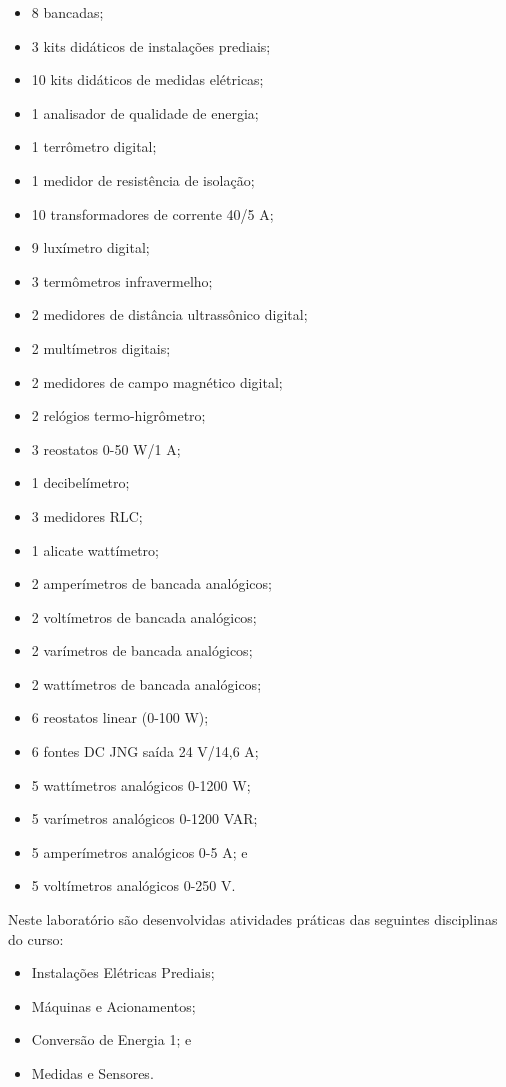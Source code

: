 \begin{itemize}
    \item 8 bancadas;
    \item 3 kits didáticos de instalações prediais; 
    \item 10 kits didáticos de medidas elétricas; 
    \item 1 analisador de qualidade de energia; 
    \item 1 terrômetro digital; 
    \item 1 medidor de resistência de isolação; 
    \item 10 transformadores de corrente 40/5 A; 
    \item 9 luxímetro digital; 
    \item 3 termômetros infravermelho; 
    \item 2 medidores de distância ultrassônico digital; 
    \item 2 multímetros digitais; 
    \item 2 medidores de campo magnético digital;
    \item 2 relógios termo-higrômetro; 
    \item 3 reostatos 0-50 W/1 A; 
    \item 1 decibelímetro; 
    \item 3 medidores RLC; 
    \item 1 alicate wattímetro; 
    \item 2 amperímetros de bancada analógicos; 
    \item 2 voltímetros de bancada analógicos; 
    \item 2 varímetros de bancada analógicos; 
    \item 2 wattímetros de bancada analógicos; 
    \item 6 reostatos linear (0-100 W); 
    \item 6 fontes DC JNG saída 24 V/14,6 A; 
    \item 5 wattímetros analógicos 0-1200 W;
    \item 5 varímetros analógicos 0-1200 VAR; 
    \item 5 amperímetros analógicos 0-5 A; e
    \item 5 voltímetros analógicos 0-250 V.    
\end{itemize}

Neste laboratório são desenvolvidas atividades práticas das seguintes disciplinas do curso:

\begin{itemize}
    \item Instalações Elétricas Prediais;
    \item Máquinas e Acionamentos;
    \item Conversão de Energia 1; e
    \item Medidas e Sensores.    
\end{itemize}

